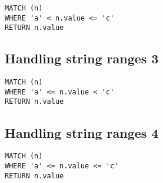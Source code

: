 \begin{lstlisting}
MATCH (n)
WHERE 'a' < n.value <= 'c'
RETURN n.value
\end{lstlisting}

\subsection{Handling string ranges 3}

\begin{lstlisting}
MATCH (n)
WHERE 'a' <= n.value < 'c'
RETURN n.value
\end{lstlisting}

\subsection{Handling string ranges 4}

\begin{lstlisting}
MATCH (n)
WHERE 'a' <= n.value <= 'c'
RETURN n.value
\end{lstlisting}


